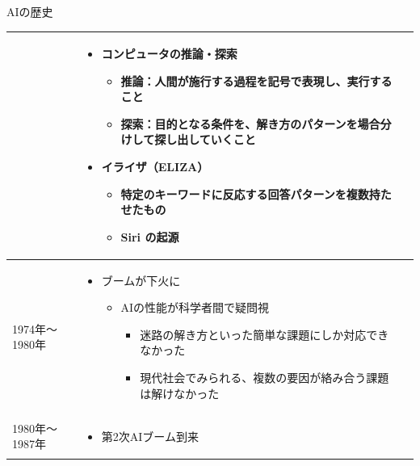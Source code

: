 \documentclass[dvipdfmx,aspectratio=169]{beamer}
\begin{document}
\begin{frame}[shrink]{AIの歴史}
\begin{table}[h]
\begin{tabular}{lp{35em}p{40em}}
\begin{minipage}{35em}
\begin{itemize}
												\end{itemize}
											\end{minipage}
										& \begin{minipage}{40em}
											\begin{itemize}
												\item コンピュータの\alert{推論}・\alert{探索}
												\begin{itemize}
													\item 推論：人間が施行する過程を記号で表現し、実行すること
													\item 探索：目的となる条件を、解き方のパターンを場合分けして探し出していくこと
												\end{itemize}
												\item \alert{イライザ}（ELIZA）
												\begin{itemize}
													\item 特定のキーワードに反応する回答パターンを複数持たせたもの
													\item Siri の起源
												\end{itemize}
											\end{itemize}
										\end{minipage} \\
				\midrule
				1974年～1980年            & \begin{minipage}{35em}
												\begin{itemize}
													\item ブームが下火に
													\begin{itemize}
														\item AIの性能が科学者間で疑問視
														\begin{itemize}
															\item 迷路の解き方といった簡単な課題にしか対応できなかった
															\item 現代社会でみられる、複数の要因が絡み合う課題は解けなかった
														\end{itemize}
													\end{itemize}
												\end{itemize}
											\end{minipage} & \\
				\midrule
				1980年～1987年            & \begin{minipage}{35em}
												\begin{itemize}
													\item 第2次AIブーム到来

\end{itemize}
\end{minipage}
\end{tabular}
\end{table}
\end{frame}
\end{document}
